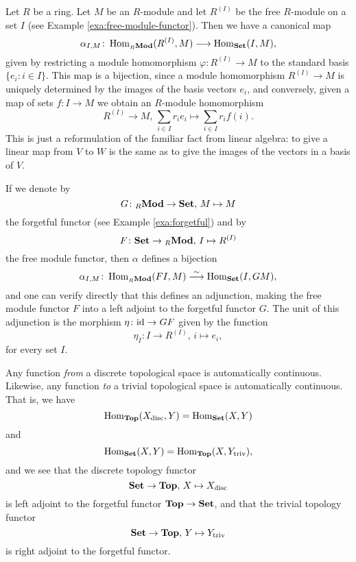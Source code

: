 \begin{example}\label{exa:free-forgetful-adjunction}
Let $R$ be a ring. Let $M$ be an $R$-module and let $R^{(I)}$ be the free $R$-module on  a set $I$ (see Example \ref{exa:free-module-functor}). Then we have a canonical map
\[
	\alpha_{I,M} \colon \operatorname{Hom}_{{}_R\mathbf{Mod}}( R^{(I)},  M ) \longrightarrow \operatorname{Hom}_{\mathbf{Set}}(  I,  M  ),
\]
given by restricting a module homomorphism $\varphi \colon R^{(I)}\to M$ to the standard basis  $\{e_i\colon i\in I\}$. This map is a bijection, since a module homomorphism $R^{(I)} \to M$ is uniquely determined by the images of the basis vectors $e_i$, and conversely, given a map of sets $f\colon I \to M$ we obtain an $R$-module homomorphism
\[
	R^{(I)} \to M,\, \sum_{i\in I} r_i e_i \mapsto \sum_{i \in I} r_i f(i).
\]
This is just a reformulation of the familiar fact from linear algebra: to give a linear map from $V$ to $W$ is the same as to give the images of the vectors in a basis of $V$.

If we denote by
\[
	G\colon {}_R\mathbf{Mod} \to \mathbf{Set},\, M \mapsto M
\]
the forgetful functor (see Example \ref{exa:forgetful}) and by
\[
	F\colon \mathbf{Set} \to {}_R\mathbf{Mod},\,I \mapsto R^{(I)}
\] 
the free module functor, then $\alpha$ defines a bijection
\[
	\alpha_{I,M}\colon \operatorname{Hom}_{{}_R\mathbf{Mod}}( FI, M ) \overset{\sim}{\longrightarrow} \operatorname{Hom}_{\mathbf{Set}}( I,  GM ),
\]
and one can verify directly that this defines an adjunction, making the free module functor $F$ into a left adjoint to the forgetful functor $G$. The unit of this adjunction is the morphism $\eta\colon {\rm id} \to GF$ given by the function
\[
	\eta_I \colon I \to R^{(I)},\, i \mapsto e_i,
\]
for every set $I$.
\end{example}

\begin{example}\label{exa:discrete-forgetful-trivial}
Any function \emph{from} a discrete topological space is automatically continuous. Likewise, any function \emph{to} a trivial topological space is automatically continuous. That is, we have 
\[
	\operatorname{Hom}_{\mathbf{Top}}(X_{\mathrm{disc}}, Y ) = \operatorname{Hom}_{\mathbf{Set}}( X, Y )
\]
and
\[
	\operatorname{Hom}_{\mathbf{Set}}( X, Y ) = \operatorname{Hom}_{\mathbf{Top}}( X, Y_{\mathrm{triv}}),
\]
and we see that the discrete topology functor
\[
	\mathbf{Set} \to \mathbf{Top},\, X\mapsto X_{\mathrm{disc}}
\]
is left adjoint to the forgetful functor $\mathbf{Top} \to \mathbf{Set}$, and that the trivial topology functor
\[
	\mathbf{Set} \to \mathbf{Top},\, Y \mapsto Y_{\mathrm{triv}}
\]
is right adjoint to the forgetful functor.
\end{example}


